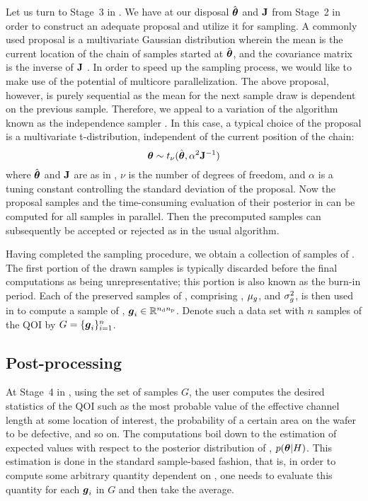 Let us turn to Stage~3 in . We have at our disposal $\hat{\boldsymbol{\theta}}$
and $\mathbf{J}$ from Stage~2 in order to construct an adequate proposal and utilize
it for sampling. A commonly used proposal is a multivariate Gaussian
distribution wherein the mean is the current location of the chain of samples
started at $\hat{\boldsymbol{\theta}}$, and the covariance matrix is the inverse of $\mathbf{J}$
\cite{gelman2004}. In order to speed up the sampling process, we would like to
make use of the potential of multicore parallelization. The above proposal,
however, is purely sequential as the mean for the next sample draw is dependent
on the previous sample. Therefore, we appeal to a variation of the 
algorithm known as the independence sampler \cite{gelman2004}. In this case, a
typical choice of the proposal is a multivariate t-distribution, independent of
the current position of the chain:
\begin{equation} \elab{proposal}
  \vt \sim t_\nu(\hat{\vt}, \alpha^2 \m{J}^{-1})
\end{equation}
where $\hat{\boldsymbol{\theta}}$ and $\mathbf{J}$ are as in , $\nu$ is the number
of degrees of freedom, and $\alpha$ is a tuning constant controlling the
standard deviation of the proposal. Now the proposal samples and the
time-consuming evaluation of their posterior in  can be computed
for all samples in parallel. Then the precomputed samples can subsequently be
accepted or rejected as in the usual  algorithm.

Having completed the sampling procedure, we obtain a collection of samples of
\vt. The first portion of the drawn samples is typically discarded before the
final computations as being unrepresentative; this portion is also known as the
burn-in period. Each of the preserved samples of \vt, comprising \vz, $\mu_g$,
and $\sigma^2_g$, is then used in  to compute a
sample of \g, $\boldsymbol{g}_i \in \mathbb{R}^{{n_\mathrm{d}} {n_\mathrm{p}}}$. Denote such a data set with $n$
samples of the \ac{QOI} by $G = \{ \boldsymbol{g}_i \}_{i = 1}^n$.

\subsection{Post-processing}

At Stage~4 in , using the set of samples $G$, the user computes
the desired statistics of the \ac{QOI} such as the most probable value of the
effective channel length at some location of interest, the probability of a
certain area on the wafer to be defective, and so on. The computations boil down
to the estimation of expected values with respect to the posterior distribution
of \vt, $p(\boldsymbol{\theta} | H)$. This estimation is done in the standard sample-based
fashion, that is, in order to compute some arbitrary quantity dependent on \g,
one needs to evaluate this quantity for each $\boldsymbol{g}_i$ in $G$ and then take the
average.

